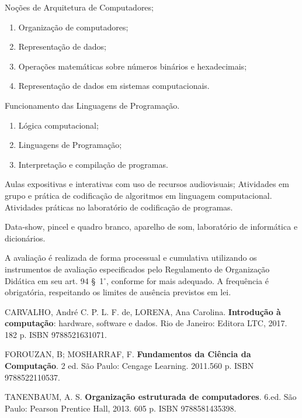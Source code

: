 \begin{pud}
\begin{description}[itemsep=0em]
	    \item[UNIDADE III:]  Noções de Arquitetura de Computadores;
	   \begin{enumerate}[itemsep=0em, topsep=0em]
	     \item Organização de computadores;
	     \item Representação de dados;
	     \item Operações matemáticas sobre números binários e hexadecimais;
	     \item Representação de dados em sistemas computacionais.
	   \end{enumerate}
	   
	   	    
	    \item[UNIDADE IV:] Funcionamento das Linguagens de Programação.
	    \begin{enumerate}[itemsep=0em, topsep=0em]
	     \item Lógica computacional;
	     \item Linguagens de Programação;
	     \item Interpretação e compilação de programas.
	   \end{enumerate}
	   
	\end{description}
	
	
	\metodologia            	
       Aulas expositivas e interativas com uso de recursos audiovisuais;
       Atividades em grupo e prática de codificação de algoritmos em linguagem computacional.
       Atividades práticas no laboratório de codificação de programas.
	
	\recursos
	Data-show, pincel e quadro branco, aparelho de som, laboratório de informática e
dicionários.
	
\avaliacao A avaliação é realizada de forma processual e cumulativa utilizando
os instrumentos de avaliação especificados pelo Regulamento de Organização
Didática em seu art. 94 \S~1$^\circ$, conforme for mais adequado. A frequência é
obrigatória, respeitando os limites de ausência previstos em lei.
\naopresencial
	
	\begin{bibbasica}
		\item CARVALHO, André C. P. L. F. de, LORENA, Ana Carolina. \textbf{Introdução à
computação}: hardware, software e dados. Rio de Janeiro: Editora LTC, 2017. 182
p. ISBN 9788521631071.
		\item FOROUZAN, B; MOSHARRAF, F. \textbf{Fundamentos da Ciência da Computação}. 2
ed. São Paulo: Cengage Learning. 2011.560 p. ISBN 9788522110537.
		\item TANENBAUM, A. S. \textbf{Organização estruturada de computadores}. 6.ed. São
Paulo: Pearson Prentice Hall, 2013. 605 p. ISBN 9788581435398.
	 	 

\end{bibbasica}
\end{pud}

